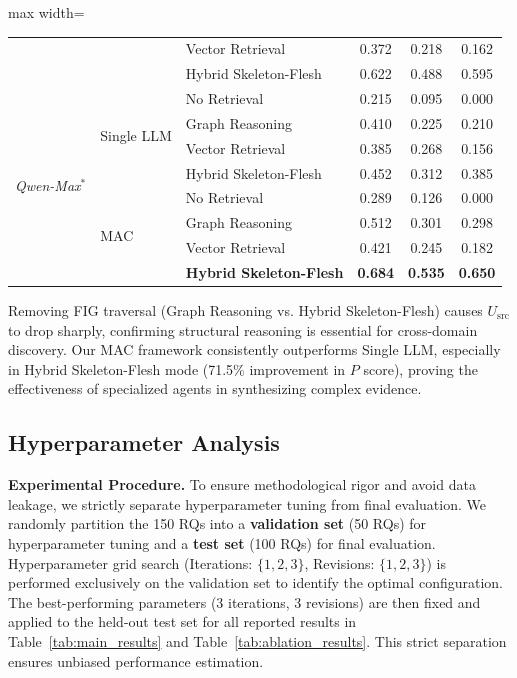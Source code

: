 \documentclass[runningheads]{llncs}
\begin{document}
\begin{table}[t]
\begin{adjustbox}{max width=\textwidth}
\begin{tabular}{lllccc}
 &  & Vector Retrieval & 0.372 & 0.218 & 0.162 \\
 &  & Hybrid Skeleton-Flesh & 0.622 & 0.488 & 0.595 \\
\midrule
\multirow{8}{*}{\textit{Qwen-Max}$^*$} 
 & \multirow{4}{*}{Single LLM} & No Retrieval & 0.215 & 0.095 & 0.000 \\
 &  & Graph Reasoning & 0.410 & 0.225 & 0.210 \\
 &  & Vector Retrieval & 0.385 & 0.268 & 0.156 \\
 &  & Hybrid Skeleton-Flesh & 0.452 & 0.312 & 0.385 \\
\cmidrule{2-6}
 & \multirow{4}{*}{MAC} & No Retrieval & 0.289 & 0.126 & 0.000 \\
 &  & Graph Reasoning & 0.512 & 0.301 & 0.298 \\
 &  & Vector Retrieval & 0.421 & 0.245 & 0.182 \\
 &  & \textbf{Hybrid Skeleton-Flesh} & \textbf{0.684} & \textbf{0.535} & \textbf{0.650} \\
\bottomrule
\end{tabular}
\end{adjustbox}
\end{table}

Removing FIG traversal (Graph Reasoning vs. Hybrid Skeleton-Flesh) causes $U_{\text{src}}$ to drop sharply, confirming structural reasoning is essential for cross-domain discovery. Our MAC framework consistently outperforms Single LLM, especially in Hybrid Skeleton-Flesh mode (71.5\% improvement in $P$ score), proving the effectiveness of specialized agents in synthesizing complex evidence.
\subsection{Hyperparameter Analysis}
\label{sec:hyperparams}

\textbf{Experimental Procedure.} To ensure methodological rigor and avoid data leakage, we strictly separate hyperparameter tuning from final evaluation. We randomly partition the 150 RQs into a \textbf{validation set} (50 RQs) for hyperparameter tuning and a \textbf{test set} (100 RQs) for final evaluation. Hyperparameter grid search (Iterations: $\{1,2,3\}$, Revisions: $\{1,2,3\}$) is performed exclusively on the validation set to identify the optimal configuration. The best-performing parameters (3 iterations, 3 revisions) are then fixed and applied to the held-out test set for all reported results in Table~\ref{tab:main_results} and Table~\ref{tab:ablation_results}. This strict separation ensures unbiased performance estimation.
\end{document}
